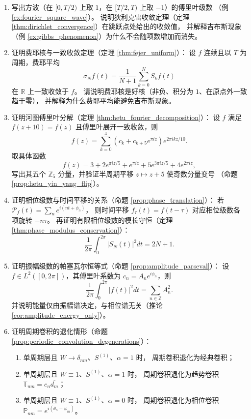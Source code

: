 \begin{enumerate}[leftmargin=3em, label=\textbf{题 \arabic*}]
    \item 写出方波（在 $[0,T/2)$ 上取 $1$，在 $[T/2,T)$ 上取 $-1$）的傅里叶级数
    （例 \ref{ex:fourier_square_wave}）。
    说明狄利克雷收敛定理（定理 \ref{thm:dirichlet_convergence}）在跳跃点处给出的收敛值，
    并解释吉布斯现象（例 \ref{ex:gibbs_phenomenon}）为什么不会随项数增加而消失。

    \item 证明费耶核与一致收敛定理（定理 \ref{thm:fejer_uniform}）：
    设 $f$ 连续且以 $T$ 为周期，费耶平均
    \[
    \sigma_Nf(t)=\frac{1}{N+1}\sum_{k=0}^{N}S_kf(t)
    \]
    在 $\mathbb{R}$ 上一致收敛于 $f$。
    请说明费耶核是好核（非负、积分为 $1$、在原点外一致趋于零），
    并解释为什么费耶平均能避免吉布斯现象。

    \item 证明河图傅里叶分解（定理 \ref{thm:hetu_fourier_decomposition}）：
    设 $f$ 满足 $f(z+10)=f(z)$ 且傅里叶展开一致收敛，则
    \[
    f(z)=\sum_{k=0}^{4}\left(c_k+c_{k+5}e^{\pi iz}\right)e^{2\pi ikz/10}.
    \]
    取具体函数
    \[
    f(z)=3+2e^{\pi iz/5}+e^{\pi iz}+5e^{3\pi iz/5}+4e^{2\pi iz},
    \]
    写出其五个 $\mathbb{Z}_5$ 分量，并验证半周期平移 $z\mapsto z+5$ 使奇数分量变号
    （命题 \ref{prop:hetu_yin_yang_flip}）。

    \item 证明相位级数与时间平移的关系（命题 \ref{prop:phase_translation}）：
    若 $\mathcal{P}_f(t)=\sum_n e^{i(nt+\phi_n)}$，
    则时间平移 $f_\tau(t)=f(t-\tau)$ 对应相位级数各项旋转 $-n\tau$。
    再证明有限相位级数的模长守恒（定理 \ref{thm:phase_modulus_conservation}）：
    \[
    \frac{1}{2\pi}\int_0^{2\pi}|S_N(t)|^2dt=2N+1.
    \]

    \item 证明振幅级数的帕塞瓦尔恒等式（命题 \ref{prop:amplitude_parseval}）：
    设 $f\in L^2([0,2\pi])$，其傅里叶系数为 $c_n=A_ne^{i\phi_n}$，则
    \[
    \frac{1}{2\pi}\int_0^{2\pi}|f(t)|^2dt=\sum_{n\in\mathbb{Z}}A_n^2.
    \]
    并说明能量仅由振幅谱决定，与相位谱无关（推论 \ref{cor:amplitude_energy_only}）。

    \item 证明周期卷积的退化情形（命题 \ref{prop:periodic_convolution_degenerations}）：
    \begin{enumerate}[label=(\roman*)]
        \item 单周期层且 $W\to\delta_{nm}$、$S^{(1)}$、$\alpha=1$ 时，
              周期卷积退化为经典卷积；
        \item 单周期层且 $W\equiv1$、$S^{(1)}$、$\alpha=1$ 时，
              周期卷积退化为趋势卷积 $\mathbb{T}_{nm}=c_n\overline{d_m}$；
        \item 单周期层且 $W\equiv1$、$S^{(1)}$、$\alpha=0$ 时，
              周期卷积退化为相位卷积 $\mathbb{P}_{nm}=e^{i(\theta_n-\varphi_m)}$。
    \end{enumerate}


\end{enumerate}
